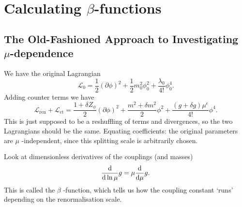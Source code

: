 \section{Calculating \texorpdfstring{$\beta$}{beta}-functions}%
\label{sec:calculating_beta_functions}

\subsection{The Old-Fashioned Approach to Investigating \texorpdfstring{$\mu$}{mu}-dependence}%
\label{sub:the_old_fashioned_approach_to_investigating_mu_dependence}

We have the original Lagrangian
\begin{equation}
  \mathscr{L}_0 = \frac{1}{2} (\partial \phi)^2 + \frac{1}{2} m_0^2 \phi_0^2 + \frac{\lambda_0}{4!} \phi_0^4.
\end{equation}
Adding counter terms we have
\begin{equation}
  \mathscr{L}_{\text{ren}} + \mathscr{L}_{\text{ct}} = \frac{1 + \delta Z_\phi}{2} (\partial \phi)^2 + \frac{m^2 + \delta m^2}{2} \phi^2 + \frac{(g + \delta g) \mu^{\epsilon}}{4!} \phi^4.
\end{equation}
This is just supposed to be a reshuffling of terms and divergences, so the two Lagrangians should be the same. Equating coefficients: the original parameters are $\mu$ -independent, since this splitting scale is arbitrarily chosen.

Look at dimensionless derivatives of the couplings (and masses)
\begin{equation}
  \dv{\ln \mu} g = \mu \dv{\mu} g.
\end{equation}
This is called the $\beta$ -function, which tells us how the coupling constant `runs' depending on the renormalisation scale.

